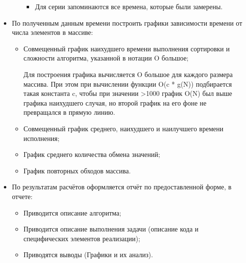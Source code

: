 \documentclass[12pt, a4paper]{report}
\begin{document}
\begin{itemize}
\begin{itemize}
\begin{itemize}
				\item Для серии запоминаются все времена, которые были замерены.
			\end{itemize}
		\end{itemize}
		\item По полученным данным времени построить графики зависимости времени от числа элементов в массиве:
		\begin{itemize}
			\item Совмещенный график наихудшего времени выполнения сортировки и сложности алгоритма, указанной в нотации O большое; \par
			Для построения графика вычисляется O большое для каждого размера массива. При этом при вычислении функции O(c * g(N)) подбирается такая константа c, чтобы при значении >1000 график O(N) был выше графика наихудшего случая, но второй график на его фоне не превращался в прямую линию.
			\item Совмещенный график среднего, наихудшего и наилучшего времени исполнения;
			\item График среднего количества обмена значений;
			\item График повторных обходов массива.
		\end{itemize}
		\item По результатам расчётов оформляется отчёт по предоставленной форме, в отчете:
		\begin{itemize}
			\item Приводится описание алгоритма;
			\item Приводится описание выполнения задачи (описание кода и специфических элементов реализации);
			\item Приводятся выводы (Графики и их анализ).
		\end{itemize}
	\end{itemize}
\end{document}
